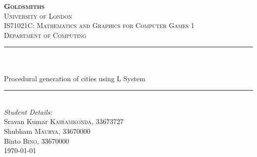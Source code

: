 \begin{titlepage}

\newcommand{\HRule}{\rule{\linewidth}{0.5mm}} %

\center %

\vspace*{\fill}\begin{center}
 
\textsc{\Huge \textbf {Goldsmiths}}\\ %
\textsc{\small University of London}\\[1.5cm] %
\textsc{\large IS71021C: Mathematics and Graphics for Computer Games 1}\\[0.5cm]
\textsc{\large Department of Computing}\\[0.5cm] %

\makeatletter
\HRule \\[0.4cm]
{ \huge \bfseries \@title}\\[0.1cm] \large Procedural generation of cities using L System
\HRule \\[1.5cm]
 
\Large \emph{Student Details:}\\ [0.2cm]
\large Sravan Kumar \textsc{Kairamkonda}, 33673727\\[0.2cm]
\large Shubham \textsc{Maurya}, 33670000\\[0.2cm] %
\large Binto \textsc{Bino}, 33670000\\[2cm]


{\large \today}\\[2cm] %


\end{center}\vspace*{\fill}
\end{titlepage}